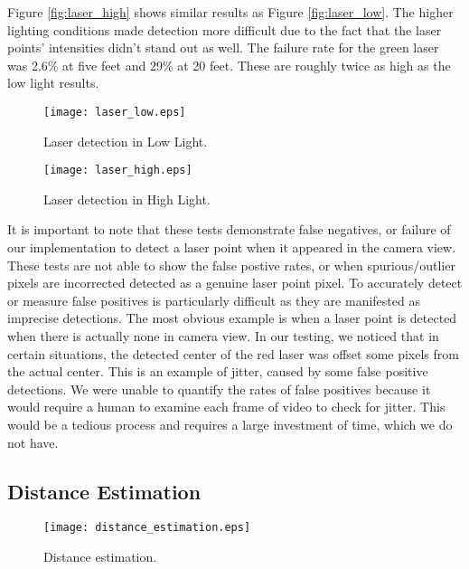 \documentclass[10pt,twocolumn,letterpaper]{article}
\begin{document}
Figure \ref{fig:laser_high} shows similar results as Figure \ref{fig:laser_low}. The higher lighting conditions made detection more difficult due to the fact that the laser points' intensities didn't stand out as well. The failure rate for the green laser was 2.6\% at five feet and 29\% at 20 feet. These are roughly twice as high as the low light results.

\begin{figure}[t]
\begin{center}
  \texttt{[image: laser\_low.eps]}
\end{center}
   \caption{Laser detection in Low Light.}
\label{fig:laser_low}
\label{fig:long}
\label{fig:onecol}
\end{figure}

\begin{figure}[t]
\begin{center}
  \texttt{[image: laser\_high.eps]}
\end{center}
   \caption{Laser detection in High Light.}
\label{fig:laser_high}
\label{fig:long}
\label{fig:onecol}
\end{figure}

It is important to note that these tests demonstrate false negatives, or failure of our implementation to detect a laser point when it appeared in the camera view.  These tests are not able to show the false postive rates, or when spurious/outlier pixels are incorrected detected as a genuine laser point pixel.  To accurately detect or measure false positives is particularly difficult as they are manifested as imprecise detections.  The most obvious example is when a laser point is detected when there is actually none in camera view.  In our testing, we noticed that in certain situations, the detected center of the red laser was offset some pixels from the actual center.  This is an example of jitter, caused by some false positive detections.  We were unable to quantify the rates of false positives because it would require a human to examine each frame of video to check for jitter.  This would be a tedious process and requires a large investment of time, which we do not have.

\subsection{Distance Estimation}

\begin{figure}[t]
\begin{center}
  \texttt{[image: distance\_estimation.eps]}
\end{center}
   \caption{Distance estimation.}
\label{fig:distance_estimation}
\label{fig:long}
\label{fig:onecol}
\end{figure}
\end{document}

